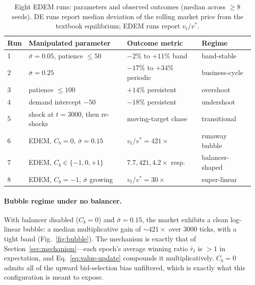 \documentclass{article}
\begin{document}
\begin{table}[h]
\centering
\caption{Eight EDEM runs: parameters and observed outcomes
(median across $\ge 8$ seeds). DE runs report median deviation of
the rolling market price from the textbook equilibrium; EDEM runs
report $v_t/v^*$.}
\label{tab:regimes}
\small
\begin{tabular}{l l l l}
\toprule
\textbf{Run} & \textbf{Manipulated parameter} & \textbf{Outcome metric} & \textbf{Regime} \\
\midrule
1 & $\bar\sigma=0.05$, patience $\le 50$       & $-2\%$ to $+11\%$ band      & band-stable        \\
2 & $\bar\sigma=0.25$                          & $-17\%$ to $+34\%$ periodic & business-cycle     \\
3 & patience $\le 100$                         & $+14\%$ persistent          & overshoot          \\
4 & demand intercept $-50$                     & $-18\%$ persistent          & undershoot         \\
5 & shock at $t=3000$, then re-shocks          & moving-target chase         & transitional       \\
\midrule
6 & EDEM, $C_b = 0$, $\bar\sigma=0.15$         & $v_t/v^* = 421\times$       & runaway bubble     \\
7 & EDEM, $C_b\in\{-1, 0, +1\}$                & $7.7, 421, 4.2\times$ resp. & balancer-shaped    \\
8 & EDEM, $C_b=-1$, $\bar\sigma$ growing       & $v_t/v^* = 30\times$        & super-linear       \\
\bottomrule
\end{tabular}
\end{table}

\paragraph{Bubble regime under no balancer.}
With balancer disabled ($C_b = 0$) and $\bar\sigma = 0.15$, the
market exhibits a clean log-linear bubble: a median multiplicative
gain of $\sim 421\times$ over 3000 ticks, with a tight band
(Fig.~\ref{fig:bubble}). The mechanism is exactly that of
Section~\ref{sec:mechanism}---each epoch's average winning ratio
$\bar r_t$ is $>1$ in expectation, and Eq.~\eqref{eq:value-update}
compounds it multiplicatively. $C_b=0$ admits all of the upward
bid-selection bias unfiltered, which is exactly what this
configuration is meant to expose.
\end{document}
